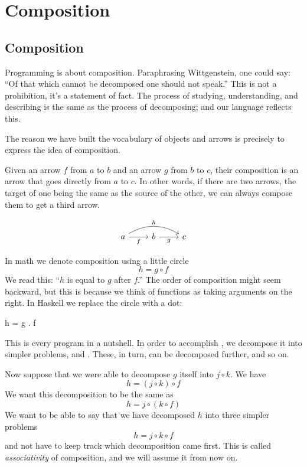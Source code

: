 \documentclass[DaoFP]{subfiles}
\begin{document}
\setcounter{chapter}{1}
\chapter{Composition}

\section{Composition}

Programming is about composition. Paraphrasing Wittgenstein, one could say: ``Of that which cannot be decomposed one should not speak.'' This is not a prohibition, it's a statement of fact. The process of studying, understanding, and describing is the same as the process of decomposing; and our language reflects this. 

The reason we have built the vocabulary of objects and arrows is precisely to express the idea of composition.  

Given an arrow $f$ from $a$ to $b$ and an arrow $g$ from $b$ to $c$, their composition is an arrow that goes directly from $a$ to $c$. In other words, if there are two arrows, the target of one being the same as the source of the other, we can always compose them to get a third arrow.

\[
 \begin{tikzcd}
 a
 \arrow[rr, bend left, "h"]
 \arrow[r, "f"']
 & b
 \arrow[r, "g"']
& c
 \end{tikzcd}
\]

In math we denote composition using a little circle
\[h = g \circ f\]
We read this: ``$h$ is equal to $g$ after $f$.'' The order of composition might seem backward, but this is because we think of functions as taking arguments on the right.
In Haskell we replace the circle with a dot:
\begin{haskell}
h = g . f
\end{haskell}
This is every program in a nutshell. In order to accomplish , we decompose it into simpler problems,  and . These, in turn, can be decomposed further, and so on.

Now suppose that we were able to decompose $g$ itself into $j \circ k$. We have
\[h = (j \circ k) \circ f\]
We want this decomposition to be the same as
\[h = j \circ (k \circ f)\]
We want to be able to say that we have decomposed $h$ into three simpler problems
\[h =  j \circ k \circ f\]
and not have to keep track which decomposition came first. This is called \emph{associativity} of composition, and we will assume it from now on.
\end{document}
